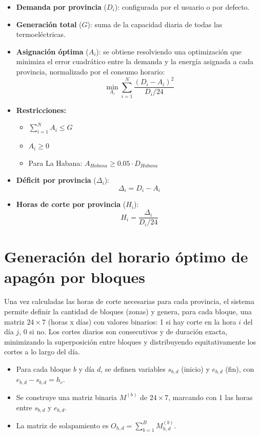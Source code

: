 \documentclass[a4paper,12pt]{article}
\begin{document}
\begin{itemize}
    \item \textbf{Demanda por provincia} ($D_i$): configurada por el usuario o por defecto.
    \item \textbf{Generación total} ($G$): suma de la capacidad diaria de todas las termoeléctricas.
    \item \textbf{Asignación óptima} ($A_i$): se obtiene resolviendo una optimización que minimiza el error cuadrático entre la demanda y la energía asignada a cada provincia, normalizado por el consumo horario:
    \begin{equation}
        \min_{A_i} \sum_{i=1}^{N} \frac{(D_i - A_i)^2}{D_i/24}
    \end{equation}
    \item \textbf{Restricciones:}
    \begin{itemize}
        \item $\sum_{i=1}^{N} A_i \leq G$
        \item $A_i \geq 0$
        \item Para La Habana: $A_{Habana} \geq 0.05 \cdot D_{Habana}$
    \end{itemize}
    \item \textbf{Déficit por provincia} ($\Delta_i$):
    \begin{equation}
        \Delta_i = D_i - A_i
    \end{equation}
    \item \textbf{Horas de corte por provincia} ($H_i$):
    \begin{equation}
        H_i = \frac{\Delta_i}{D_i/24}
    \end{equation}
\end{itemize}

\section{Generación del horario óptimo de apagón por bloques}
Una vez calculadas las horas de corte necesarias para cada provincia, el sistema permite definir la cantidad de bloques (zonas) y genera, para cada bloque, una matriz $24 \times 7$ (horas x días) con valores binarios: 1 si hay corte en la hora $i$ del día $j$, 0 si no. Los cortes diarios son consecutivos y de duración exacta, minimizando la superposición entre bloques y distribuyendo equitativamente los cortes a lo largo del día.

\begin{itemize}
    \item Para cada bloque $b$ y día $d$, se definen variables $s_{b,d}$ (inicio) y $e_{b,d}$ (fin), con $e_{b,d} - s_{b,d} = h_c$.
    \item Se construye una matriz binaria $M^{(b)}$ de $24 \times 7$, marcando con 1 las horas entre $s_{b,d}$ y $e_{b,d}$.
    \item La matriz de solapamiento es $O_{h,d} = \sum_{b=1}^B M_{h,d}^{(b)}$.
\end{itemize}
\end{document}
